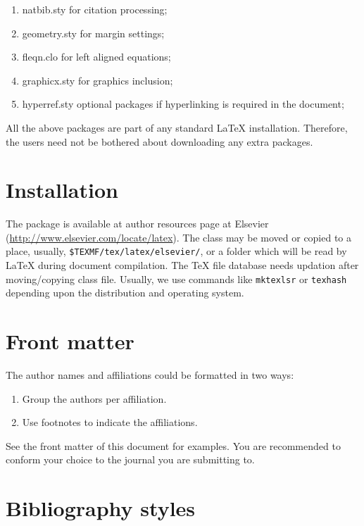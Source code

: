 \documentclass[a4paper,fleqn]{cas-sc}
\begin{document}
\begin{enumerate}
\itemsep=0pt
\item {natbib.sty} for citation processing;
\item {geometry.sty} for margin settings;
\item {fleqn.clo} for left aligned equations;
\item {graphicx.sty} for graphics inclusion;
\item {hyperref.sty} optional packages if hyperlinking is
  required in the document;
\end{enumerate}  

All the above packages are part of any
standard \LaTeX{} installation.
Therefore, the users need not be
bothered about downloading any extra packages.

\section{Installation}

The package is available at author resources page at Elsevier
(\url{http://www.elsevier.com/locate/latex}).
The class may be moved or copied to a place, usually,
\verb+$TEXMF/tex/latex/elsevier/+, %
or a folder which will be read                   
by \LaTeX{} during document compilation.  The \TeX{} file
database needs updation after moving/copying class file.  Usually,
we use commands like \verb+mktexlsr+ or \verb+texhash+ depending
upon the distribution and operating system.

\section{Front matter}

The author names and affiliations could be formatted in two ways:
\begin{enumerate}[(1)]
\item Group the authors per affiliation.
\item Use footnotes to indicate the affiliations.
\end{enumerate}
See the front matter of this document for examples. 
You are recommended to conform your choice to the journal you 
are submitting to.

\section{Bibliography styles}
\end{document}
